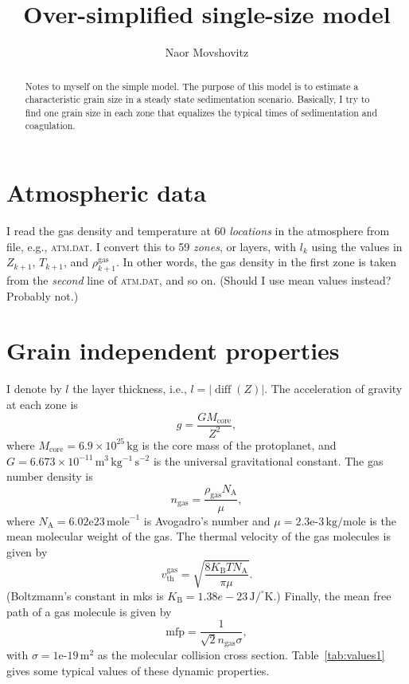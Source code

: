 \documentclass[aps,pra,preprint]{revtex4-2}
\theoremstyle{definition}
\DeclareMathOperator{\diff}{diff}
\newcommand{\unit}[1]{\,\mathrm{#1}} %
\newcommand{\abs}[1]{\left\vert#1\right\vert} %
\begin{document}
\title{Over-simplified single-size model}
\author{Naor Movshovitz}

\begin{abstract}
Notes to myself on the simple model. The purpose of this model is to estimate a
characteristic grain size in a steady state sedimentation scenario. Basically,
I try to find one grain size in each zone that equalizes the typical times of
sedimentation and coagulation.

\end{abstract}
\maketitle

\section*{Atmospheric data}
I read the gas density and temperature at 60 \emph{locations} in the atmosphere
from file, e.g., \textsc{atm.dat}. I convert this to 59 \emph{zones}, or
layers, with $l_k$ using the values in $Z_{k+1}$, $T_{k+1}$, and
$\rho^{\text{gas}}_{k+1}$. In other words, the gas density in the first zone is
taken from the \emph{second} line of \textsc{atm.dat}, and so on. (Should I use
mean values instead? Probably not.)

\section*{Grain independent properties}
I denote by $l$ the layer thickness, i.e., $l=\abs{\diff(Z)}$. The acceleration
of gravity at each zone is
\begin{equation}
g=\frac{GM_{\text{core}}}{Z^2},
\end{equation}
where $M_{\text{core}}=6.9\times10^{25}\unit{kg}$ is the core mass of the
protoplanet, and $G=6.673\times10^{-11}\unit{m^3\,kg^{-1}\,s^{-2}}$ is the
universal gravitational constant. The gas number density is
\begin{equation}
n_{\text{gas}}=\frac{\rho_{\text{gas}}N_\text{A}}{\mu},
\end{equation}
where $N_{\text{A}}=6.02\text{e23}\unit{\text{mole}^{-1}}$ is Avogadro's number
and $\mu=2.3\text{e-3}\unit{kg/\text{mole}}$ is the mean molecular weight of
the gas. The thermal velocity of the gas molecules is given by
\begin{equation}\label{eq:vthgas}
v_\text{th}^\text{gas}=\sqrt{\frac{8K_\text{B}T{N}_\text{A}}{\pi\mu}}.
\end{equation}
(Boltzmann's constant in mks is $K_\text{B}=1.38e-23\unit{J/^\circ{K}}$.)
Finally, the mean free path of a gas molecule is given by
\begin{equation}
\text{mfp}=\frac{1}{\sqrt{2}n_\text{gas}\sigma},
\end{equation}
with $\sigma=1\text{e-19}\unit{m^2}$ as the molecular collision cross section.
Table~\ref{tab:values1} gives some typical values of these dynamic properties.
\end{document}

